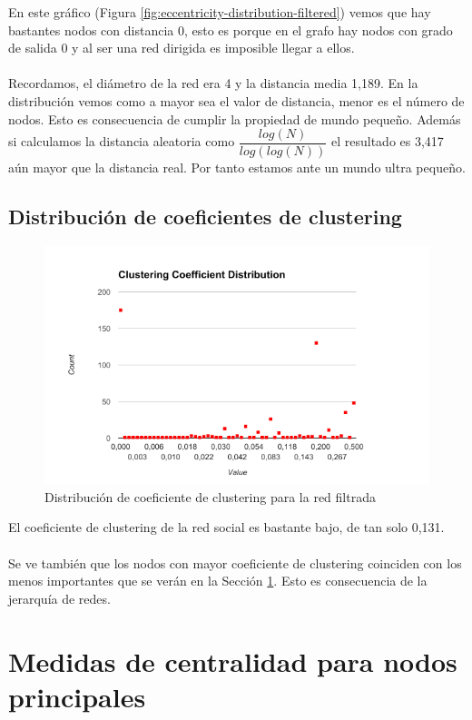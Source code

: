 En este gráfico (Figura \ref{fig:eccentricity-distribution-filtered}) vemos que hay bastantes nodos con distancia 0, esto es porque en el grafo hay nodos con grado de salida 0 y al ser una red dirigida es imposible llegar a ellos.
\\ \\
Recordamos, el diámetro de la red era 4 y la distancia media 1,189. En la distribución vemos como a mayor sea el valor de distancia, menor es el número de nodos. Esto es consecuencia de cumplir la propiedad de mundo pequeño. Además si calculamos la distancia aleatoria como $ \dfrac{log(N)}{log(log(N))} $ el resultado es 3,417 aún mayor que la distancia real. Por tanto estamos ante un mundo ultra pequeño.

\subsection{Distribución de coeficientes de clustering}

\begin{figure}[H]
	\centering
	\includegraphics[width=12cm]{img/clustering-coefficient-distribution-filtered}
	\caption{Distribución de coeficiente de clustering para la red filtrada}
	\label{fig:clustering-coefficient-distribution-filtered}
\end{figure}

El coeficiente de clustering de la red social es bastante bajo, de tan solo 0,131.
\\ \\
Se ve también que los nodos con mayor coeficiente de clustering coinciden con los menos importantes que se verán en la Sección \ref{sec:hubs}. Esto es consecuencia de la jerarquía de redes.

\section{Medidas de centralidad para nodos principales}
\label{sec:hubs}


